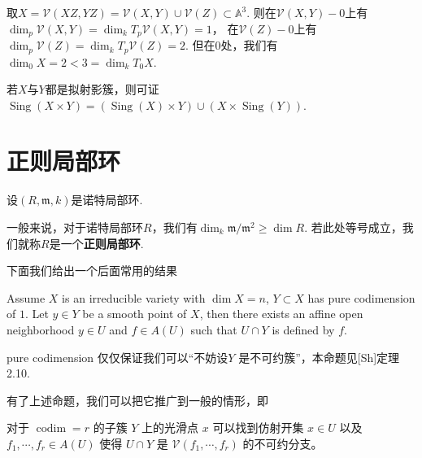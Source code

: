     \begin{example}
        取$X = \mathcal{V}(XZ,YZ) = \mathcal{V}(X,Y) \cup \mathcal{V}(Z) \subset \mathbb{A}^{3}$.
        则在$\mathcal{V}(X,Y) - 0$上有$\dim_{p}\mathcal{V}(X,Y) = \dim_{k} T_{p}\mathcal{V}(X,Y) = 1$，
        在$\mathcal{V}(Z) - 0$上有$\dim_{p}\mathcal{V}(Z) = \dim_{k} T_{p}\mathcal{V}(Z) = 2$.
        但在$0$处，我们有$\dim_{0}X = 2 < 3 = \dim_{k} T_{0}X$.
    \end{example}

    \begin{remark}
        若$X$与$Y$都是拟射影簇，则可证$\operatorname{Sing}(X \times Y)
        = (\operatorname{Sing}(X) \times Y) \cup (X \times \operatorname{Sing}(Y))$.
    \end{remark}

\section{正则局部环}
    设$(R,\mathfrak{m},k)$是诺特局部环.
    \begin{definition}
        一般来说，对于诺特局部环$R$，我们有$\dim_{k} \mathfrak{m}/\mathfrak{m}^{2} 
        \geq \dim R$. 若此处等号成立，我们就称$R$是一个\textbf{正则局部环}.
    \end{definition}

    下面我们给出一个后面常用的结果
    \begin{proposition}
        Assume $X$ is an irreducible variety with $\dim X=n$, 
        $Y\subset X$ has pure codimension of $1$. 
        Let $y\in Y$ be a smooth point of $X$, then 
        there exists an affine open neighborhood $y\in U$ and $f\in A(U)$ 
        such that $U\cap Y$ is defined by $f$.
    \end{proposition}
    \begin{remark}
        pure codimension 仅仅保证我们可以“不妨设$Y$ 是不可约簇”，本命题见[Sh]定理2.10.
    \end{remark}
    有了上述命题，我们可以把它推广到一般的情形，即
    \begin{corollary}
        对于 $\operatorname{codim}=r$ 的子簇 $Y$ 上的光滑点 $x$ 可以找到仿射开集 $x\in U$ 以及 $f_{1},\cdots,f_{r}\in A(U)$ 使得 $U\cap Y$ 是 $\mathcal{V}(f_{1},\cdots,f_{r})$ 的不可约分支。
    \end{corollary}


